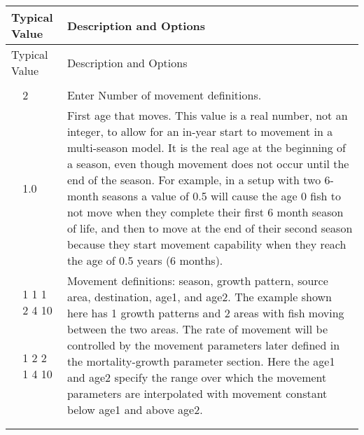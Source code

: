 \begin{longtable}{p{0.5cm} p{2cm} p{12.5cm}}
	\hline
	\multicolumn{2}{l}{Typical Value} & Description and Options \Tstrut\Bstrut\\
	\hline
	\endfirsthead

	\hline
	\multicolumn{2}{l}{Typical Value} & Description and Options \Tstrut\Bstrut\\
	\hline
	\endhead

	\hline
	\endfoot

	\endlastfoot
	
	\multicolumn{3}{l}{COND: only if areas > 1} \Tstrut\\ 
	& 2 & Enter Number of movement definitions. \Tstrut\\		
	\Tstrut & 1.0 & First age that moves. This value is a real number, not an integer, to allow for an in-year start to movement in a multi-season model. It is the real age at the beginning of a season, even though movement does not occur until the end of the season. For example, in a setup with two 6-month seasons a value of 0.5 will cause the age 0 fish to not move when they complete their first 6 month season of life, and then to move at the end of their second season because they start movement capability when they reach the age of 0.5 years (6 months). \\

	\Tstrut & 1 1 1 2 4 10 & \multicolumn{1}{l}{\multirow{5}{6cm}{\parbox{12cm}{Movement definitions: season, growth pattern, source area, destination, age1, and age2. The example shown here has 1 growth patterns and 2 areas with fish moving between the two areas. The rate of movement will be controlled by the movement parameters later defined in the mortality-growth parameter section. Here the age1 and age2 specify the range over which the movement parameters are interpolated with movement constant below age1 and above age2.}}} \\
	& 1 2 2 1 4 10 & \Bstrut\\
	\\
	\\
	\\
	\\ 
	\\
	\hline
	\end{longtable}
	\vspace*{-\baselineskip}
	

